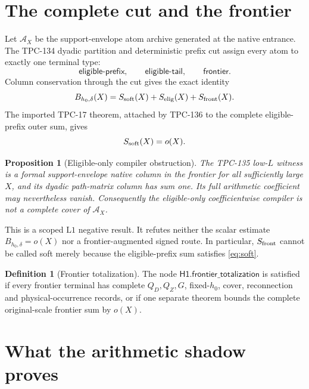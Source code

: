 \documentclass[11pt]{article}
\newtheorem{proposition}[theorem]{Proposition}
\theoremstyle{definition}
\newtheorem{definition}[theorem]{Definition}
\theoremstyle{remark}
\newcommand{\Lone}{\mathrm{L1}}
\newcommand{\Bhard}{B_{h_0,\delta}}
\begin{document}
\section{The complete cut and the frontier}

Let \(\mathcal A_X\) be the support-envelope atom archive generated at
the native entrance.  The TPC-134 dyadic partition and deterministic
prefix cut assign every atom to exactly one terminal type:
\[
\mathsf{eligible\mbox{-}prefix},\qquad
\mathsf{eligible\mbox{-}tail},\qquad
\mathsf{frontier}.
\]
Column conservation through the cut gives the exact identity
\begin{equation}
 \Bhard(X)
 =
 S_{\rm soft}(X)+S_{\rm elig}(X)+S_{\rm front}(X).
\label{eq:cut}
\end{equation}
The imported TPC-17 theorem, attached by TPC-136 to the complete
eligible-prefix outer sum, gives
\begin{equation}
 S_{\rm soft}(X)=o(X).
\label{eq:soft}
\end{equation}

\begin{proposition}[Eligible-only compiler obstruction]
\label{prop:frontier}
The TPC-135 low-\(L\) witness is a formal support-envelope native
column in the frontier for all sufficiently large \(X\), and its
dyadic path-matrix column has sum one.  Its full arithmetic
coefficient may nevertheless vanish.  Consequently the eligible-only
coefficientwise compiler is not a complete cover of \(\mathcal A_X\).
\end{proposition}

This is a scoped \(\Lone\) negative result.  It refutes neither the
scalar estimate \(\Bhard=o(X)\) nor a frontier-augmented signed route.
In particular, \(S_{\rm front}\) cannot be called soft merely because
the eligible-prefix sum satisfies \eqref{eq:soft}.

\begin{definition}[Frontier totalization]
The node \(\mathsf{H1.frontier\_totalization}\) is satisfied if every
frontier terminal has complete \(Q_D,Q_Z,G\), fixed-\(h_0\), cover,
reconnection and physical-occurrence records, or if one separate
theorem bounds the complete original-scale frontier sum by \(o(X)\).
\end{definition}

\section{What the arithmetic shadow proves}
\end{document}
